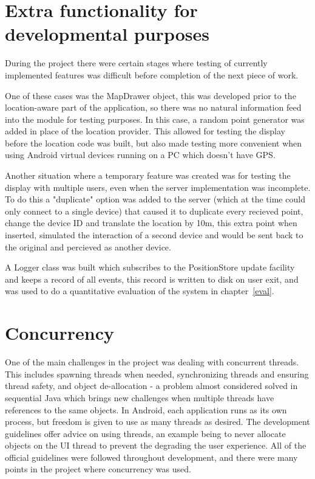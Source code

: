 \section{Extra functionality for developmental purposes}

During the project there were certain stages where testing of currently implemented features was difficult before completion of the next piece of work.

One of these cases was the MapDrawer object, this was developed prior to the location-aware part of the application, so there was no natural information feed into the module for testing purposes. In this case, a random point generator was added in place of the location provider. This allowed for testing the display before the location code was built, but also made testing more convenient when using Android virtual devices running on a PC which doesn't have GPS.

Another situation where a temporary feature was created was for testing the display with multiple users, even when the server implementation was incomplete. To do this a "duplicate" option was added to the server (which at the time could only connect to a single device) that caused it to duplicate every recieved point, change the device ID and translate the location by 10m, this extra point when inserted, simulated the interaction of a second device and would be sent back to the original and percieved as another device.

\label{logging}
A Logger class was built which subscribes to the PositionStore update facility and keeps a record of all events, this record is written to disk on user exit, and was used to do a quantitative evaluation of the system in chapter~\ref{eval}.

\section{Concurrency}

One of the main challenges in the project was dealing with concurrent threads. This includes spawning threads when needed, synchronizing threads and ensuring thread safety, and object de-allocation - a problem almost considered solved in sequential Java which brings new challenges when multiple threads have references to the same objects.
In Android, each application runs as its own process, but freedom is given to use as many threads as desired. The development guidelines offer advice on using threads, an example being to never allocate objects on the UI thread to prevent the degrading the user experience. All of the official guidelines were followed throughout development, and there were many points in the project where concurrency was used.

